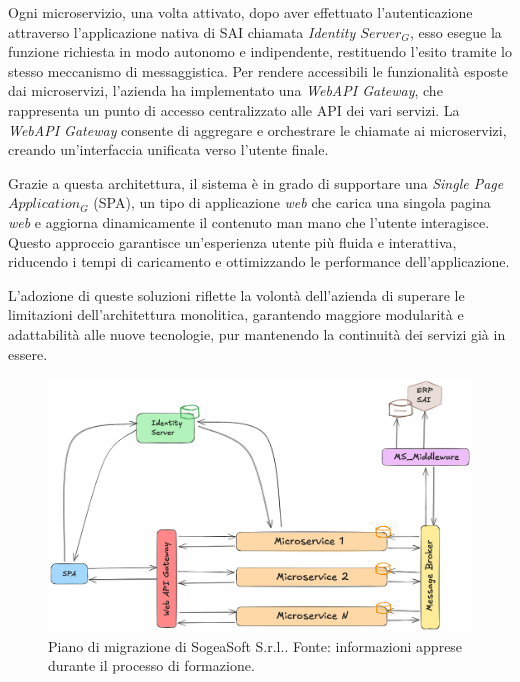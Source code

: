         \vspace{0.2 em}
        \noindent Ogni microservizio, una volta attivato, dopo aver effettuato l'autenticazione attraverso l'applicazione nativa di SAI chiamata \textit{Identity $Server_G$}, esso esegue la funzione richiesta in modo autonomo e indipendente, restituendo l’esito tramite lo stesso meccanismo di messaggistica. Per rendere accessibili le funzionalità esposte dai microservizi, l'azienda ha implementato una \textit{WebAPI Gateway}, che rappresenta un punto di accesso centralizzato alle API dei vari servizi. La \textit{WebAPI Gateway} consente di aggregare e orchestrare le chiamate ai microservizi, creando un'interfaccia unificata verso l'utente finale.  

        \vspace{0.2 em}
        \noindent Grazie a questa architettura, il sistema è in grado di supportare una \textit{Single Page $Application_G$} (SPA), un tipo di applicazione \textit{web} che carica una singola pagina \textit{web} e aggiorna dinamicamente il contenuto man mano che l'utente interagisce. Questo approccio garantisce un'esperienza utente più fluida e interattiva, riducendo i tempi di caricamento e ottimizzando le performance dell'applicazione.  

        \vspace{0.2 em}
        \noindent L'adozione di queste soluzioni riflette la volontà dell'azienda di superare le limitazioni dell'architettura monolitica, garantendo maggiore modularità e adattabilità alle nuove tecnologie, pur mantenendo la continuità dei servizi già in essere.

        \begin{figure}[H]
            \centering
            \includegraphics[width=0.6\linewidth]{BCS-Tessi/images/migrazione.png}
            \caption[Piano di migrazione di SogeaSoft S.r.l.]{Piano di migrazione di SogeaSoft S.r.l.. Fonte: informazioni apprese durante il processo di formazione. }
            \label{fig:enter-label}
        \end{figure}
        
